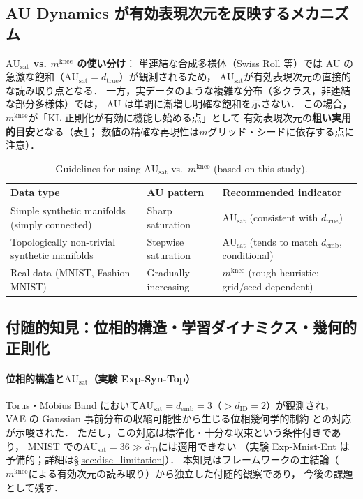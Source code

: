\documentclass[11pt,a4paper]{jsarticle}
\newcommand{\dID}{d_{\mathrm{ID}}}
\newcommand{\dtrue}{d_{\mathrm{true}}}
\newcommand{\AUsat}{\mathrm{AU}_{\mathrm{sat}}}
\newcommand{\mknee}{m^{\mathrm{knee}}}
\newcommand{\demb}{d_{\mathrm{emb}}}
\begin{document}
\subsection{AU Dynamics が有効表現次元を反映するメカニズム}\label{sec:disc_au_dynamics}

\textbf{$\AUsat$ vs. $\mknee$ の使い分け}：
単連結な合成多様体（Swiss Roll 等）では AU の急激な飽和（$\AUsat = \dtrue$）が観測されるため，
$\AUsat$が有効表現次元の直接的な読み取り点となる．
一方，実データのような複雑な分布（多クラス，非連結な部分多様体）では，
AU は単調に漸増し明確な飽和を示さない．
この場合，$\mknee$が「KL 正則化が有効に機能し始める点」として
有効表現次元の\textbf{粗い実用的目安}となる（表\ref{tab:au_comparison}；
数値の精確な再現性は$m$グリッド・シードに依存する点に注意）．

\begin{table}[H]
\centering
\caption{Guidelines for using $\AUsat$ vs.\ $\mknee$ (based on this study).}
\label{tab:au_comparison}
\small
\begin{tabular}{p{4.6cm}p{2.9cm}p{5.6cm}}
\toprule
Data type & AU pattern & Recommended indicator \\
\midrule
Simple synthetic manifolds (simply connected) & Sharp saturation & $\AUsat$ (consistent with $\dtrue$) \\
Topologically non-trivial synthetic manifolds & Stepwise saturation & $\AUsat$ (tends to match $\demb$, conditional) \\
Real data (MNIST, Fashion-MNIST) & Gradually increasing & $\mknee$ (rough heuristic; grid/seed-dependent) \\
\bottomrule
\end{tabular}
\end{table}

\subsection{付随的知見：位相的構造・学習ダイナミクス・幾何的正則化}\label{sec:disc_incidental}

\paragraph{位相的構造と$\AUsat$（実験 Exp-Syn-Top）}
Torus・Möbius Band において$\AUsat = \demb = 3$（$> \dID = 2$）が観測され，
VAE の Gaussian 事前分布の収縮可能性から生じる位相幾何学的制約
\cite{hatcher2002algebraic,guillemin1974differential}との対応が示唆された．
ただし，この対応は標準化・十分な収束という条件付きであり，
MNIST での$\AUsat = 36 \gg \hat{d}_\mathrm{ID}$には適用できない
（実験 Exp-Mnist-Ent は予備的；詳細は§\ref{sec:disc_limitation}）．
本知見はフレームワークの主結論（$\mknee$による有効次元の読み取り）から独立した付随的観察であり，
今後の課題として残す．
\end{document}

